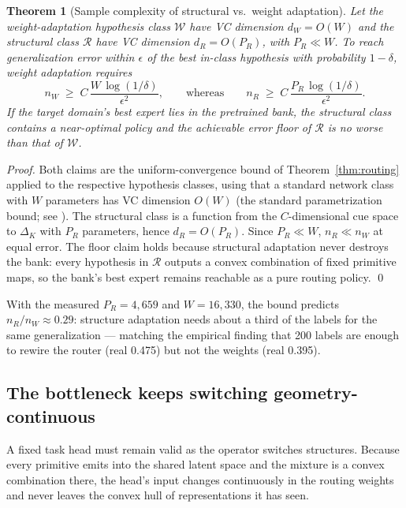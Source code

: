 \documentclass[11pt,a4paper]{article}
\newtheorem{theorem}{Theorem}
\begin{document}
\begin{theorem}[Sample complexity of structural vs.\ weight adaptation]
\label{thm:structure}
Let the weight-adaptation hypothesis class $\mathcal{W}$ have VC dimension
$d_W = O(W)$ and the structural class $\mathcal{R}$ have VC dimension
$d_R = O(P_R)$, with $P_R \ll W$. To reach generalization error within
$\epsilon$ of the best in-class hypothesis with probability $1-\delta$, weight
adaptation requires
\[
  n_W \;\geq\; C\,\frac{W\,\log(1/\delta)}{\epsilon^{2}},
\qquad\text{whereas}\qquad
  n_R \;\geq\; C\,\frac{P_R\,\log(1/\delta)}{\epsilon^{2}}.
\]
If the target domain's best expert lies in the pretrained bank, the structural
class contains a near-optimal policy and the achievable error floor of
$\mathcal{R}$ is no worse than that of $\mathcal{W}$.
\end{theorem}

\begin{proof}
Both claims are the uniform-convergence bound of Theorem~\ref{thm:routing}
applied to the respective hypothesis classes, using that a standard network
class with $W$ parameters has VC dimension $O(W)$ (the standard parametrization
bound; see \cite{shalevshwartz}). The structural class is a function from the
$C$-dimensional cue space to $\Delta_K$ with $P_R$ parameters, hence $d_R =
O(P_R)$. Since $P_R \ll W$, $n_R \ll n_W$ at equal error. The floor claim holds
because structural adaptation never destroys the bank: every hypothesis in
$\mathcal{R}$ outputs a convex combination of fixed primitive maps, so the
bank's best expert remains reachable as a pure routing policy. \qed
\end{proof}

With the measured $P_R = 4{,}659$ and $W = 16{,}330$, the bound predicts
$n_R/n_W \approx 0.29$: structure adaptation needs about a third of the labels
for the same generalization — matching the empirical finding that 200 labels
are enough to rewire the router (real 0.475) but not the weights (real 0.395).

\subsection{The bottleneck keeps switching geometry-continuous}
\label{sec:theory-bottleneck}

A fixed task head must remain valid as the operator switches structures.
Because every primitive emits into the shared latent space and the mixture is a
convex combination there, the head's input changes continuously in the routing
weights and never leaves the convex hull of representations it has seen.
\end{document}
